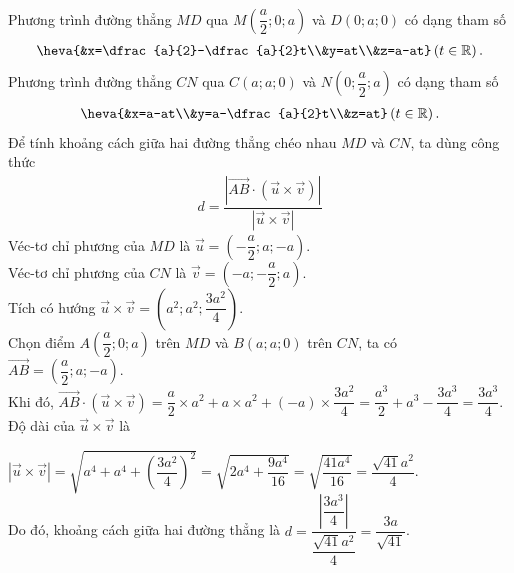 \begin{bt}
{\begin{enumerate}
\begin{eqnarray*}
	\end{eqnarray*}
	Phương trình đường thẳng $MD$ qua $M\left(\dfrac{a}{2};0;a \right) $ và $D(0;a;0)$ có dạng tham số 
	\begin{eqnarray*}
		\heva{&x=\dfrac{a}{2}-\dfrac{a}{2}t\\&y=at\\&z=a-at} \left(t\in\mathbb{R} \right).
	\end{eqnarray*}
		Phương trình đường thẳng $CN$ qua $C\left(a;a;0 \right)$ và $N\left(0;\dfrac{a}{2};a\right) $ có dạng tham số 
	\begin{eqnarray*}
		\heva{&x=a-at\\&y=a-\dfrac{a}{2}t\\&z=at} \left(t\in\mathbb{R} \right). 
	\end{eqnarray*}
	Để tính khoảng cách giữa hai đường thẳng chéo nhau $MD$ và $CN$, ta dùng công thức
	\begin{eqnarray*}
		d=\dfrac{\left|\overrightarrow{AB}\cdot\left(\overrightarrow{u}\times\overrightarrow{v} \right)  \right|}{\left|\overrightarrow{u}\times\overrightarrow{v} \right| }
	\end{eqnarray*}
	Véc-tơ chỉ phương của $MD$ là $\overrightarrow{u}=\left(-\dfrac{a}{2};a;-a\right)$.\\
	Véc-tơ chỉ phương của $CN$ là $\overrightarrow{v}=\left(-a;-\dfrac{a}{2};a\right)$.\\
	Tích có hướng $\overrightarrow{u}\times\overrightarrow{v}=\left(a^{2};a^{2};\dfrac{3a^{2}}{4} \right) $.\\
	Chọn điểm $A\left(\dfrac{a}{2};0;a \right) $ trên $MD$ và $B\left(a;a;0 \right)$ trên $CN$, ta có $\overrightarrow{AB}=\left(\dfrac{a}{2};a;-a\right) $.\\
	Khi đó, $\overrightarrow{AB}\cdot\left(\overrightarrow{u}\times\overrightarrow{v} \right)=\dfrac{a}{2}\times a^{2}+a\times a^{2}+(-a)\times \dfrac{3a^{2}}{4}=\dfrac{a^{3}}{2}+a^{3}-\dfrac{3a^{3}}{4}=\dfrac{3a^{3}}{4}$.\\
	Độ dài của $\overrightarrow{u}\times\overrightarrow{v}$ là
	
	$\left| \overrightarrow{u}\times\overrightarrow{v}\right|=\sqrt{a^{4}+a^{4}+\left(\dfrac{3a^{2}}{4} \right)^{2} }=\sqrt{2a^{4}+\dfrac{9a^{4}}{16}}=\sqrt{\dfrac{41a^{4}}{16}}=\dfrac{\sqrt{41}a^{2}}{4} $.\\
	Do đó, khoảng cách giữa hai đường thẳng là $d=\dfrac{\left|\dfrac{3a^{3}}{4} \right| }{\dfrac{\sqrt{41}a^{2}}{4}}=\dfrac{3a}{\sqrt{41}}$.
	\end{enumerate}
	}
\end{bt}

